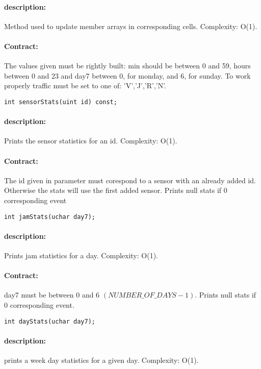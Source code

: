 \documentclass[a4paper, 12pts]{article}
\begin{document}
\paragraph{description:}
	Method used to update member arrays in corresponding cells. Complexity: O(1).
\paragraph{Contract:}
	The values given must be rightly built: min should be between 0 and 59, hours between 0 and 23 and day7 between 0, for monday, and 6, for sunday. To work properly traffic must be set to one of: 'V','J','R','N'.

\begin{lstlisting}
int sensorStats(uint id) const;
\end{lstlisting}
\paragraph{description:}
	Prints the sensor statistics for an id. Complexity: O(1).
\paragraph{Contract:}
	The id given in parameter must corespond to a sensor with an already added id. Otherwise the stats will use the first added sensor. Prints null stats if 0 corresponding event

\begin{lstlisting}
int jamStats(uchar day7);
\end{lstlisting}
\paragraph{description:}
	Prints jam statistics for a day. Complexity: O(1).
\paragraph{Contract:}
	day7 must be between 0 and 6 $(NUMBER\_OF\_DAYS-1)$. Prints null stats if 0 corresponding event.
		
\begin{lstlisting}
int dayStats(uchar day7);
\end{lstlisting}
\paragraph{description:}
	prints a week day statistics for a given day. Complexity: O(1).
\end{document}
